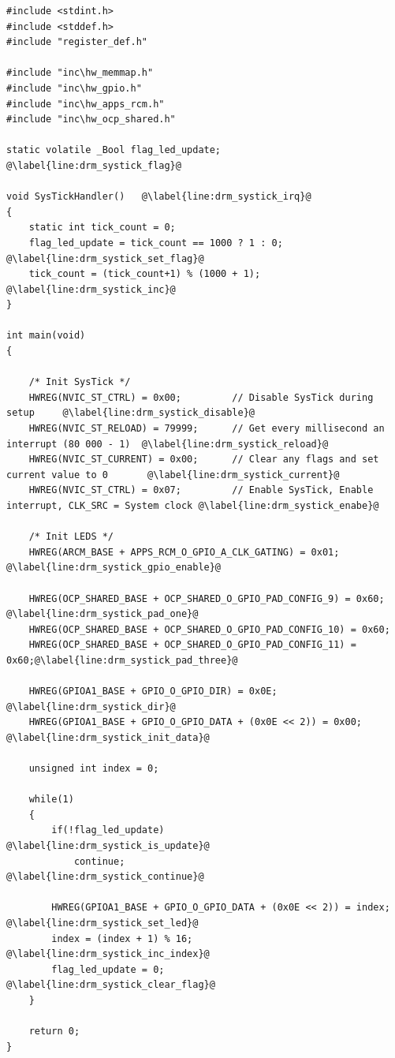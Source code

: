 \newpage
\begin{lstlisting}[style=CStyle, caption={Toggling LEDs according to Table \ref{tab:led_scheme} using DRM programming technique}, captionpos=b, label={lst:led_systick_drm}, escapechar=@]
#include <stdint.h>
#include <stddef.h>
#include "register_def.h"

#include "inc\hw_memmap.h"
#include "inc\hw_gpio.h"
#include "inc\hw_apps_rcm.h"
#include "inc\hw_ocp_shared.h"

static volatile _Bool flag_led_update;  @\label{line:drm_systick_flag}@

void SysTickHandler()   @\label{line:drm_systick_irq}@
{
    static int tick_count = 0;
    flag_led_update = tick_count == 1000 ? 1 : 0;   @\label{line:drm_systick_set_flag}@
    tick_count = (tick_count+1) % (1000 + 1);       @\label{line:drm_systick_inc}@
}

int main(void)
{

    /* Init SysTick */
    HWREG(NVIC_ST_CTRL) = 0x00;         // Disable SysTick during setup     @\label{line:drm_systick_disable}@
    HWREG(NVIC_ST_RELOAD) = 79999;      // Get every millisecond an interrupt (80 000 - 1)  @\label{line:drm_systick_reload}@
    HWREG(NVIC_ST_CURRENT) = 0x00;      // Clear any flags and set current value to 0       @\label{line:drm_systick_current}@
    HWREG(NVIC_ST_CTRL) = 0x07;         // Enable SysTick, Enable interrupt, CLK_SRC = System clock @\label{line:drm_systick_enabe}@

    /* Init LEDS */
    HWREG(ARCM_BASE + APPS_RCM_O_GPIO_A_CLK_GATING) = 0x01;     @\label{line:drm_systick_gpio_enable}@

    HWREG(OCP_SHARED_BASE + OCP_SHARED_O_GPIO_PAD_CONFIG_9) = 0x60; @\label{line:drm_systick_pad_one}@
    HWREG(OCP_SHARED_BASE + OCP_SHARED_O_GPIO_PAD_CONFIG_10) = 0x60;
    HWREG(OCP_SHARED_BASE + OCP_SHARED_O_GPIO_PAD_CONFIG_11) = 0x60;@\label{line:drm_systick_pad_three}@

    HWREG(GPIOA1_BASE + GPIO_O_GPIO_DIR) = 0x0E;            @\label{line:drm_systick_dir}@
    HWREG(GPIOA1_BASE + GPIO_O_GPIO_DATA + (0x0E << 2)) = 0x00; @\label{line:drm_systick_init_data}@

    unsigned int index = 0;

    while(1)
    {
        if(!flag_led_update)        @\label{line:drm_systick_is_update}@
            continue;               @\label{line:drm_systick_continue}@

        HWREG(GPIOA1_BASE + GPIO_O_GPIO_DATA + (0x0E << 2)) = index;    @\label{line:drm_systick_set_led}@
        index = (index + 1) % 16;                                       @\label{line:drm_systick_inc_index}@
        flag_led_update = 0;                                            @\label{line:drm_systick_clear_flag}@
    }

    return 0;
}
\end{lstlisting}

